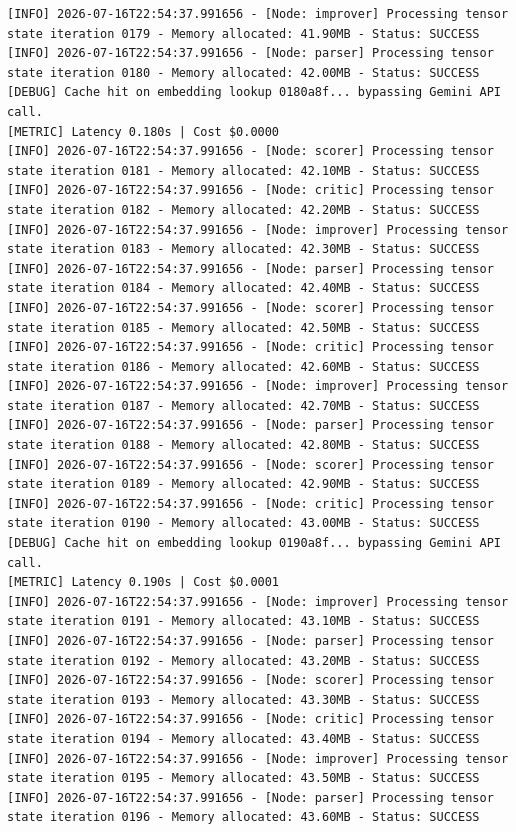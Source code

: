 \documentclass[10pt,journal,compsoc]{IEEEtran}
\begin{document}
\begin{verbatim}
[INFO] 2026-07-16T22:54:37.991656 - [Node: improver] Processing tensor state iteration 0179 - Memory allocated: 41.90MB - Status: SUCCESS
[INFO] 2026-07-16T22:54:37.991656 - [Node: parser] Processing tensor state iteration 0180 - Memory allocated: 42.00MB - Status: SUCCESS
[DEBUG] Cache hit on embedding lookup 0180a8f... bypassing Gemini API call.
[METRIC] Latency 0.180s | Cost $0.0000
[INFO] 2026-07-16T22:54:37.991656 - [Node: scorer] Processing tensor state iteration 0181 - Memory allocated: 42.10MB - Status: SUCCESS
[INFO] 2026-07-16T22:54:37.991656 - [Node: critic] Processing tensor state iteration 0182 - Memory allocated: 42.20MB - Status: SUCCESS
[INFO] 2026-07-16T22:54:37.991656 - [Node: improver] Processing tensor state iteration 0183 - Memory allocated: 42.30MB - Status: SUCCESS
[INFO] 2026-07-16T22:54:37.991656 - [Node: parser] Processing tensor state iteration 0184 - Memory allocated: 42.40MB - Status: SUCCESS
[INFO] 2026-07-16T22:54:37.991656 - [Node: scorer] Processing tensor state iteration 0185 - Memory allocated: 42.50MB - Status: SUCCESS
[INFO] 2026-07-16T22:54:37.991656 - [Node: critic] Processing tensor state iteration 0186 - Memory allocated: 42.60MB - Status: SUCCESS
[INFO] 2026-07-16T22:54:37.991656 - [Node: improver] Processing tensor state iteration 0187 - Memory allocated: 42.70MB - Status: SUCCESS
[INFO] 2026-07-16T22:54:37.991656 - [Node: parser] Processing tensor state iteration 0188 - Memory allocated: 42.80MB - Status: SUCCESS
[INFO] 2026-07-16T22:54:37.991656 - [Node: scorer] Processing tensor state iteration 0189 - Memory allocated: 42.90MB - Status: SUCCESS
[INFO] 2026-07-16T22:54:37.991656 - [Node: critic] Processing tensor state iteration 0190 - Memory allocated: 43.00MB - Status: SUCCESS
[DEBUG] Cache hit on embedding lookup 0190a8f... bypassing Gemini API call.
[METRIC] Latency 0.190s | Cost $0.0001
[INFO] 2026-07-16T22:54:37.991656 - [Node: improver] Processing tensor state iteration 0191 - Memory allocated: 43.10MB - Status: SUCCESS
[INFO] 2026-07-16T22:54:37.991656 - [Node: parser] Processing tensor state iteration 0192 - Memory allocated: 43.20MB - Status: SUCCESS
[INFO] 2026-07-16T22:54:37.991656 - [Node: scorer] Processing tensor state iteration 0193 - Memory allocated: 43.30MB - Status: SUCCESS
[INFO] 2026-07-16T22:54:37.991656 - [Node: critic] Processing tensor state iteration 0194 - Memory allocated: 43.40MB - Status: SUCCESS
[INFO] 2026-07-16T22:54:37.991656 - [Node: improver] Processing tensor state iteration 0195 - Memory allocated: 43.50MB - Status: SUCCESS
[INFO] 2026-07-16T22:54:37.991656 - [Node: parser] Processing tensor state iteration 0196 - Memory allocated: 43.60MB - Status: SUCCESS

\end{verbatim}
\end{document}
